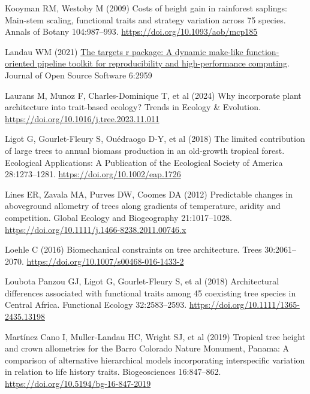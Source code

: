 \documentclass[
  12pt,
  letterpaper,
  DIV=11,
  numbers=noendperiod]{scrartcl}
\newlength{\cslhangindent}
\newlength{\cslentryspacingunit} %
\newenvironment{CSLReferences}[2] %
 {%
  \setlength{\parindent}{0pt}
  \ifodd #1
  \let\oldpar\par
  \def\par{\hangindent=\cslhangindent\oldpar}
  \fi
  \setlength{\parskip}{#2\cslentryspacingunit}
 }%
 {}
\begin{document}
\begin{CSLReferences}{1}{0}
\leavevmode{}%
Kooyman RM, Westoby M (2009) Costs of height gain in rainforest
saplings: Main-stem scaling, functional traits and strategy variation
across 75 species. Annals of Botany 104:987--993.
\url{https://doi.org/10.1093/aob/mcp185}

\leavevmode{}%
Landau WM (2021) \href{https://doi.org/10.21105/joss.02959}{The targets
r package: A dynamic make-like function-oriented pipeline toolkit for
reproducibility and high-performance computing}. Journal of Open Source
Software 6:2959

\leavevmode{}%
Laurans M, Munoz F, Charles-Dominique T, et al (2024) Why incorporate
plant architecture into trait-based ecology? Trends in Ecology \&
Evolution. \url{https://doi.org/10.1016/j.tree.2023.11.011}

\leavevmode{}%
Ligot G, Gourlet-Fleury S, Ouédraogo D-Y, et al (2018) The limited
contribution of large trees to annual biomass production in an
old-growth tropical forest. Ecological Applications: A Publication of
the Ecological Society of America 28:1273--1281.
\url{https://doi.org/10.1002/eap.1726}

\leavevmode{}%
Lines ER, Zavala MA, Purves DW, Coomes DA (2012) Predictable changes in
aboveground allometry of trees along gradients of temperature, aridity
and competition. Global Ecology and Biogeography 21:1017--1028.
\url{https://doi.org/10.1111/j.1466-8238.2011.00746.x}

\leavevmode{}%
Loehle C (2016) Biomechanical constraints on tree architecture. Trees
30:2061--2070. \url{https://doi.org/10.1007/s00468-016-1433-2}

\leavevmode{}%
Loubota Panzou GJ, Ligot G, Gourlet-Fleury S, et al (2018) Architectural
differences associated with functional traits among 45 coexisting tree
species in {Central} {Africa}. Functional Ecology 32:2583--2593.
\url{https://doi.org/10.1111/1365-2435.13198}

\leavevmode{}%
Martínez Cano I, Muller-Landau HC, Wright SJ, et al (2019) Tropical tree
height and crown allometries for the {Barro} {Colorado} {Nature}
{Monument}, {Panama}: A comparison of alternative hierarchical models
incorporating interspecific variation in relation to life history
traits. Biogeosciences 16:847--862.
\url{https://doi.org/10.5194/bg-16-847-2019}


\end{CSLReferences}
\end{document}
